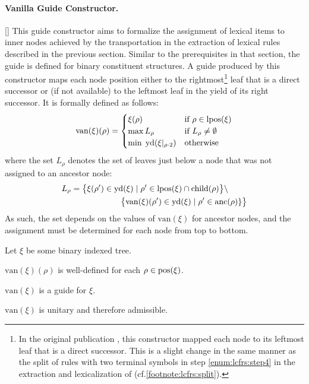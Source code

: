 \documentclass[../../document.tex]{subfiles}
\begin{document}
    \paragraph{Vanilla Guide Constructor.}[]
    This guide constructor aims to formalize the assignment of lexical items to inner nodes achieved by the transportation in the extraction of lexical  rules described in the previous section.
    Similar to the prerequisites in that section, the guide is defined for binary constituent structures.
    A guide produced by this constructor maps each node position either to the rightmost\footnote{
        In the original publication \citep{Rup22}, this constructor mapped each node to its leftmost leaf that is a direct successor.
        This is a slight change in the same manner as the split of rules with two terminal symbols in step \ref{enum:lcfrs:step4} in the extraction and lexicalization of  (cf.\@ \cref{footnote:lcfrs:split}).
    } leaf that is a direct successor or (if not available) to the leftmost leaf in the yield of its right successor.
    It is formally defined as follows:
    \[
    \mathrm{van}(\xi)(\rho) = \begin{cases}
        \xi(\rho)   & \text{if $\rho \in \operatorname{lpos}(\xi)$}\\
        \max L_\rho & \text{if $L_\rho \neq \emptyset$} \\
        \min\;\operatorname{yd}(\xi|_{\rho\cdot 2}) &\text{otherwise}
    \end{cases}
    \]
    where the set \(L_\rho\) denotes the set of leaves just below a node that was not assigned to an ancestor node:
    \begin{align*}
        L_\rho &= \big\{\xi(\rho') \in \operatorname{yd}(\xi) \mid \rho' \in \operatorname{lpos}(\xi) \cap \operatorname{child}(\rho) \big\} \setminus \\
        &\qquad\qquad\qquad  \big\{\mathrm{van}(\xi)(\rho') \in \operatorname{yd}(\xi) \mid \rho' \in \operatorname{anc}(\rho)\} \big\}
    \end{align*}
    As such, the set depends on the values of \(\mathrm{van}(\xi)\) for ancestor nodes, and the assignment must be determined for each node from top to bottom.

    \begin{theorem}
        Let \(\xi\) be some binary indexed tree.
        \begin{compactenum}
            \item \(\mathrm{van}(\xi)(\rho)\) is well-defined for each \(\rho \in \operatorname{pos}(\xi)\).
            \item \(\mathrm{van}(\xi)\) is a guide for \(\xi\).
            \item \(\mathrm{van}(\xi)\) is unitary and therefore admissible.
        \end{compactenum}
    \end{theorem}
\end{document}
